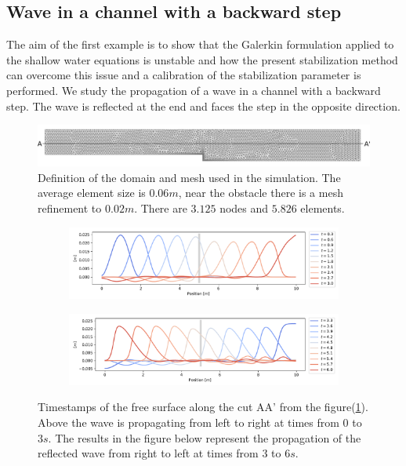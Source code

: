 \documentclass[a4paper,12pt]{article}
\begin{document}
\subsection{Wave in a channel with a backward step}

The aim of the first example is to show that the Galerkin formulation applied to the shallow water equations is unstable and how the present stabilization method can overcome this issue and a calibration of the stabilization parameter is performed.
We study the propagation of a wave in a channel with a backward step. The wave is reflected at the end and faces the step in the opposite direction. 

\begin{figure}
    \includegraphics[width=\textwidth]{img/step/mesh.pdf}
    \caption{Definition of the domain and mesh used in the simulation. The average element size is $0.06m$, near the obstacle there is a mesh refinement to $0.02m$. There are $3.125$ nodes and $5.826$ elements.}
    \label{step_mesh}
\end{figure}


\begin{figure}[H]
\begin{subfigure}{\textwidth}
    \includegraphics[width=\textwidth]{img/step/free_surface_1.pdf}
\end{subfigure}
\begin{subfigure}{\textwidth}
    \includegraphics[width=\textwidth]{img/step/free_surface_2.pdf}
\end{subfigure}
\caption{Timestamps of the free surface along the cut AA' from the figure(\ref{step_mesh}). Above the wave is propagating from left to right at times from $0$ to $3s$. The results in the figure below represent the propagation of the reflected wave from right to left at times from $3$ to $6s$.}
\label{waves_propagation}
\end{figure}
\end{document}
